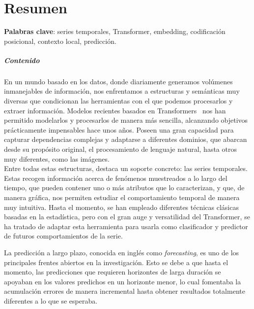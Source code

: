 %

\chapter{Resumen}

\textbf{Palabras clave}: series temporales, Transformer, embedding, codificación posicional, contexto local, predicción.

\vspace{1em}
\paragraph{Contenido}

En un mundo basado en los datos, donde diariamente generamos volúmenes inmanejables de información, nos enfrentamos a estructuras y semánticas muy diversas que condicionan las herramientas con el que podemos procesarlos y extraer información. Modelos recientes basados en Transformers~\cite{vaswani2023attentionneed} nos han permitido modelarlos y procesarlos de manera más sencilla, alcanzando objetivos prácticamente impensables hace unos años. Poseen una gran capacidad para capturar dependencias complejas y adaptarse a diferentes dominios, que abarcan desde su propósito original, el procesamiento de lenguaje natural, hasta otros muy diferentes, como las imágenes.\\
Entre todas estas estructuras, destaca un soporte concreto: las series temporales. Estas recogen información acerca de fenómenos muestreados a lo largo del tiempo, que pueden contener uno o más atributos que lo caracterizan, y que, de manera gráfica, nos permiten estudiar el comportamiento temporal de manera muy intuitiva. Hasta el momento, se han empleado diferentes técnicas clásicas basadas en la estadística, pero con el gran auge y versatilidad del Transformer, se ha tratado de adaptar esta herramienta para usarla como clasificador y predictor de futuros comportamientos de la serie.\vspace{0.35em}

La predicción a largo plazo, conocida en inglés como \textit{forecasting}, es uno de los principales frentes abiertos en la investigación. Esto se debe a que hasta el momento, las predicciones que requieren horizontes de larga duración se apoyaban en los valores predichos en un horizonte menor, lo cual fomentaba la acumulación errores de manera incremental hasta obtener resultados totalmente diferentes a lo que se esperaba. \vspace{0.35em}

